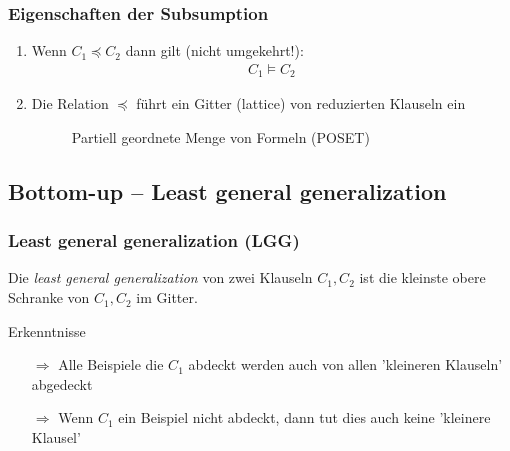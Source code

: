 \begin{frame}
	\frametitle{Eigenschaften der Subsumption}
	\begin{enumerate}
		\item {
			Wenn $C_1 \preceq C_2$ dann gilt (nicht umgekehrt!):
			\begin{align*}
				C_1 \vDash C_2
			\end{align*}
		}
		\item{ Die Relation $\preceq$ führt ein Gitter (lattice) von reduzierten Klauseln ein
			\begin{figure}[H]
				\begin{center}
				\end{center}
				\caption{Partiell geordnete Menge von Formeln (POSET)}
				\label{fig:poset_atomic}
			\end{figure}
		}
	\end{enumerate}
\end{frame}

\subsection{Bottom-up -- Least general generalization}
\begin{frame}
	\frametitle{Least general generalization (LGG)}
	 Die \textit{least general generalization} von zwei Klauseln $C_1, C_2$ ist
	 die kleinste obere Schranke von $C_1,C_2$ im Gitter.

	\begin{block}{Erkenntnisse}
			\begin{itemize}
				\item [$\Rightarrow$] Alle Beispiele die $C_1$ abdeckt werden auch von
				allen 'kleineren Klauseln' abgedeckt
				\item[$\Rightarrow$] Wenn $C_1$ ein Beispiel nicht abdeckt,
				dann tut dies auch keine 'kleinere Klausel'
			\end{itemize}
	 \end{block}
\end{frame}

